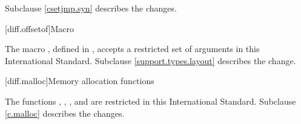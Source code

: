 Subclause \ref{csetjmp.syn} describes the changes.

[diff.offsetof]{Macro }
%

\pnum
The macro , defined in
,
accepts a restricted set of  arguments in this International Standard.
Subclause \ref{support.types.layout} describes the change.

[diff.malloc]{Memory allocation functions}

\pnum
The functions
,
,
,
and
are restricted in this International Standard.
Subclause \ref{c.malloc} describes the changes.
